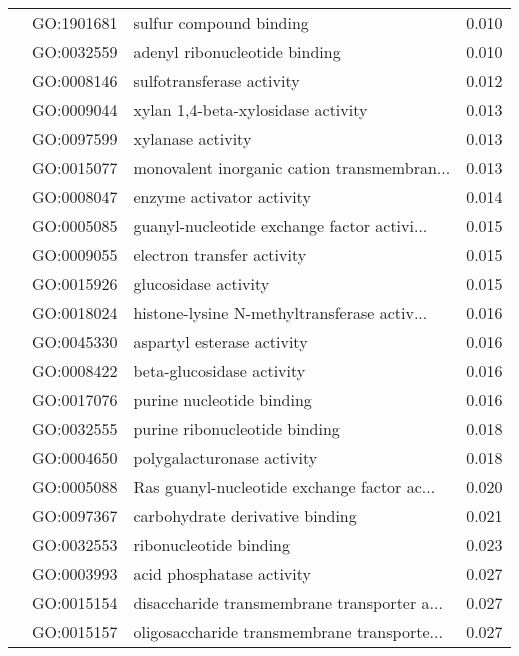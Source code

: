 \begin{longtable}{lllr}
   & GO:1901681 &                      sulfur compound binding &         0.010 \\
   & GO:0032559 &                adenyl ribonucleotide binding &         0.010 \\
   & GO:0008146 &                    sulfotransferase activity &         0.012 \\
   & GO:0009044 &           xylan 1,4-beta-xylosidase activity &         0.013 \\
   & GO:0097599 &                            xylanase activity &         0.013 \\
   & GO:0015077 &  monovalent inorganic cation transmembran... &         0.013 \\
   & GO:0008047 &                    enzyme activator activity &         0.014 \\
   & GO:0005085 &  guanyl-nucleotide exchange factor activi... &         0.015 \\
   & GO:0009055 &                   electron transfer activity &         0.015 \\
   & GO:0015926 &                         glucosidase activity &         0.015 \\
   & GO:0018024 &  histone-lysine N-methyltransferase activ... &         0.016 \\
   & GO:0045330 &                   aspartyl esterase activity &         0.016 \\
   & GO:0008422 &                    beta-glucosidase activity &         0.016 \\
   & GO:0017076 &                    purine nucleotide binding &         0.016 \\
   & GO:0032555 &                purine ribonucleotide binding &         0.018 \\
   & GO:0004650 &                   polygalacturonase activity &         0.018 \\
   & GO:0005088 &  Ras guanyl-nucleotide exchange factor ac... &         0.020 \\
   & GO:0097367 &              carbohydrate derivative binding &         0.021 \\
   & GO:0032553 &                       ribonucleotide binding &         0.023 \\
   & GO:0003993 &                    acid phosphatase activity &         0.027 \\
   & GO:0015154 &  disaccharide transmembrane transporter a... &         0.027 \\
   & GO:0015157 &  oligosaccharide transmembrane transporte... &         0.027 \\

\end{longtable}
